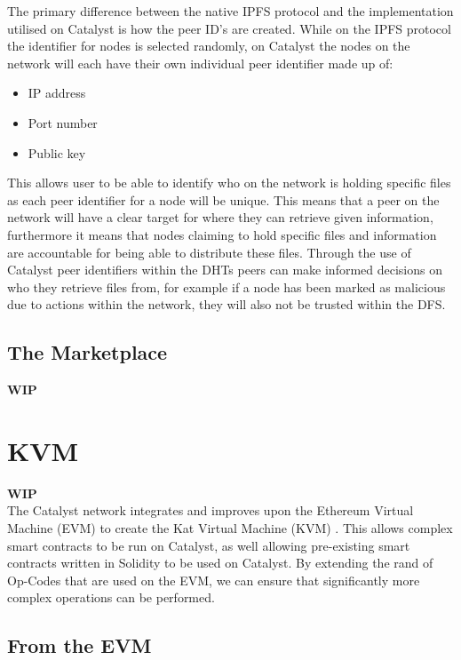 \documentclass{article}
\begin{document}
The primary difference between the native IPFS protocol and the implementation utilised on Catalyst is how the peer ID's are created.  While on the IPFS protocol the identifier for nodes is selected randomly, on Catalyst the nodes on the network will each have their own individual peer identifier\cite{BytesExtentions} made up of:

\begin{itemize}
\item IP address
\item Port number
\item Public key
\end{itemize}

This allows user to be able to identify who on the network is holding specific files as each peer identifier for a node will be unique. This means that a peer on the network will have a clear target for where they can retrieve given information, furthermore it means that nodes claiming to hold specific files and information are accountable for being able to distribute these files. Through the use of Catalyst peer identifiers within the DHTs peers can make informed decisions on who they retrieve files from, for example if a node has been marked as malicious due to actions within the network, they will also not be trusted within the DFS.


\subsection{The Marketplace}

\textbf{WIP} \\



\section{KVM}

\textbf{WIP} \\

The Catalyst network integrates and improves upon the Ethereum Virtual Machine (EVM) to create the Kat Virtual Machine (KVM) \cite{KVM}. This allows complex smart contracts to be run on Catalyst, as well allowing pre-existing smart contracts written in Solidity to be used on Catalyst. By extending the rand of Op-Codes that are used on the EVM, we can ensure that significantly more complex operations can be performed.

\subsection{From the EVM}
\end{document}
